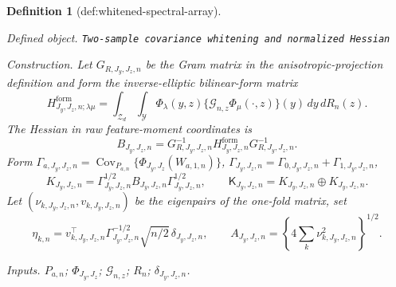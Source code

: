 \documentclass{article}
\newtheorem{definition}{Definition}
\begin{document}
\begin{definition}[def:whitened-spectral-array]\label{def:whitened-spectral-array}
\par\smallskip\noindent\emph{Defined object.} \texttt{Two-\allowbreak{}sample covariance whitening and normalized Hessian}
\par\smallskip\noindent\emph{Construction.} Let \(G_{R,J_y,J_z,n}\) be the Gram matrix in the anisotropic-projection definition and form the inverse-elliptic bilinear-form matrix
\[
H^{\mathrm{form}}_{J_y,J_z,n;\lambda\mu}
=\int_{\mathcal Z_d}\int_{\mathcal Y}\Phi_\lambda(y,z)
\{\mathcal G_{n,z}\Phi_\mu(\cdot,z)\}(y)\,dy\,dR_n(z).
\]
The Hessian in raw feature-moment coordinates is
\[
B_{J_y,J_z,n}=G_{R,J_y,J_z,n}^{-1}H^{\mathrm{form}}_{J_y,J_z,n}G_{R,J_y,J_z,n}^{-1}.
\]
Form \(\Gamma_{a,J_y,J_z,n}=\operatorname{Cov}_{P_{a,n}}\{\Phi_{J_y,J_z}(W_{a,1,n})\}\), \(\Gamma_{J_y,J_z,n}=\Gamma_{0,J_y,J_z,n}+\Gamma_{1,J_y,J_z,n}\),
\[
K_{J_y,J_z,n}=\Gamma_{J_y,J_z,n}^{1/2}B_{J_y,J_z,n}\Gamma_{J_y,J_z,n}^{1/2},
\qquad
\mathsf K_{J_y,J_z,n}=K_{J_y,J_z,n}\oplus K_{J_y,J_z,n}.
\]
Let \((\nu_{k,J_y,J_z,n},v_{k,J_y,J_z,n})\) be the eigenpairs of the one-fold matrix, set
\[
\eta_{k,n}=v_{k,J_y,J_z,n}^{\top}\Gamma_{J_y,J_z,n}^{-1/2}\sqrt{n/2}\,\delta_{J_y,J_z,n},
\qquad
A_{J_y,J_z,n}=\left\{4\sum_k\nu_{k,J_y,J_z,n}^2\right\}^{1/2}.
\]
\par\smallskip\noindent\emph{Inputs.} \(P_{a,n}\); \(\Phi_{J_y,J_z}\); \(\mathcal G_{n,z}\); \(R_n\); \(\delta_{J_y,J_z,n}\).
\end{definition}
\end{document}
